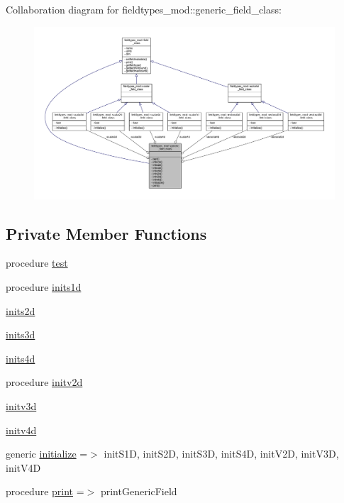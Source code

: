 Collaboration diagram for fieldtypes\+\_\+mod\+:\+:generic\+\_\+field\+\_\+class\+:\nopagebreak
\begin{figure}[H]
\begin{center}
\leavevmode
\includegraphics[width=350pt]{structfieldtypes__mod_1_1generic__field__class__coll__graph}
\end{center}
\end{figure}
\subsection*{Private Member Functions}
\begin{DoxyCompactItemize}
\item 
procedure \mbox{\hyperlink{structfieldtypes__mod_1_1generic__field__class_a1f71463147144553320805b6086d42b5}{test}}
\item 
procedure \mbox{\hyperlink{structfieldtypes__mod_1_1generic__field__class_a6a077022127f5450a2e77c034704ad2d}{inits1d}}
\item 
\mbox{\hyperlink{structfieldtypes__mod_1_1generic__field__class_ac813b40a98c7b82891bb51e6b0d56124}{inits2d}}
\item 
\mbox{\hyperlink{structfieldtypes__mod_1_1generic__field__class_a4de3770c55241bf94b3ffa523d3480f9}{inits3d}}
\item 
\mbox{\hyperlink{structfieldtypes__mod_1_1generic__field__class_ac5d07c1ce61968e5819ba410e003aec8}{inits4d}}
\item 
procedure \mbox{\hyperlink{structfieldtypes__mod_1_1generic__field__class_a5fbc115c9217689159b99058d1e38467}{initv2d}}
\item 
\mbox{\hyperlink{structfieldtypes__mod_1_1generic__field__class_a4641235772209bcc9558d6d6c53a80c7}{initv3d}}
\item 
\mbox{\hyperlink{structfieldtypes__mod_1_1generic__field__class_a178957bfe9f480ff799ca870d13db306}{initv4d}}
\item 
generic \mbox{\hyperlink{structfieldtypes__mod_1_1generic__field__class_a0fa61024cf22776788544cf848d767d7}{initialize}} =$>$ init\+S1D, init\+S2D, init\+S3D, init\+S4D, init\+V2D, init\+V3D, init\+V4D
\item 
procedure \mbox{\hyperlink{structfieldtypes__mod_1_1generic__field__class_a436070152766aaf4f47e56a1dba98611}{print}} =$>$ print\+Generic\+Field
\end{DoxyCompactItemize}

